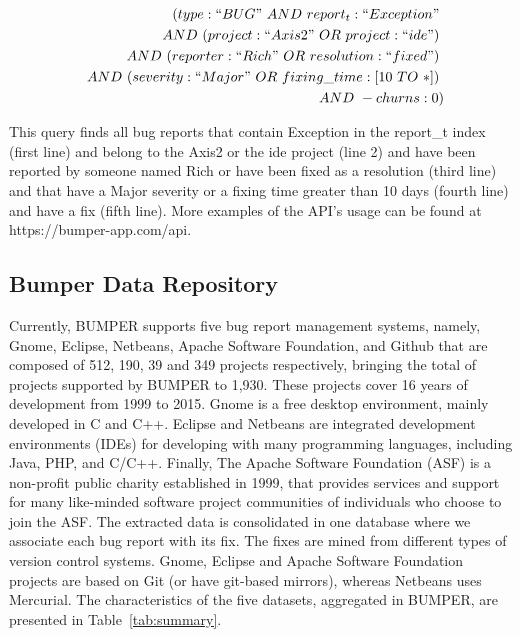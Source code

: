 \documentclass[conference]{IEEEtran}
\begin{document}
\begin{equation*}
\begin{split}
  (type:``BUG"~AND~report_t:``Exception"~\\
~~AND~(project:``Axis2"~OR~project:``ide")~\\
~~AND~(reporter:``Rich"~OR~resolution:``fixed")~\\
~~AND~(severity:``Major"~OR~fixing\_time:[10~TO~*])~\\
~~AND~-churns:0)
\end{split}
\end{equation*}

This query finds all bug reports that contain Exception in the
report\_t index (first line) and belong to the Axis2 or the ide
project (line 2) and have been reported by someone named Rich
or have been fixed as a resolution (third line) and that have a
Major severity or a fixing time greater than 10 days (fourth line)
and have a fix (fifth line).
More examples of the API's usage can
be found at https://bumper-app.com/api.


\subsection{Bumper Data Repository}
\label{sub:Bumper Data Repository}

Currently, BUMPER supports five bug report management systems, namely, Gnome, Eclipse, Netbeans, Apache Software Foundation, and Github that are composed of 512, 190, 39 and 349 projects respectively, bringing the total of projects supported by BUMPER to 1,930. These projects cover 16 years of development from 1999 to 2015.
Gnome is a free desktop environment, mainly developed in C and C++. Eclipse and Netbeans are integrated development environments (IDEs) for developing with many programming languages, including Java, PHP, and C/C++. Finally, The Apache Software Foundation (ASF) is a non-profit public charity established in 1999, that provides services and support for many like-minded software project communities of individuals who choose to join the ASF.
The extracted data is consolidated in one database where we associate each bug report with its fix.
The fixes are mined from different types of version control systems. Gnome, Eclipse and Apache Software Foundation projects are based on Git (or have git-based mirrors), whereas Netbeans uses Mercurial.
The characteristics of the five datasets, aggregated in BUMPER,  are presented in Table~\ref{tab:summary}.
\end{document}
